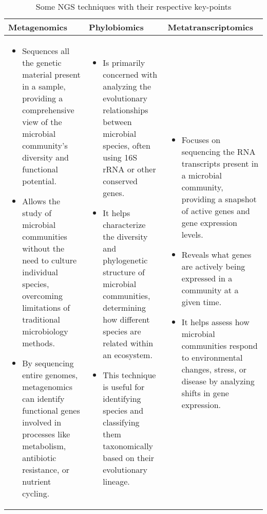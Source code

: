 \begin{table}[htbp]
    \centering
    \caption{Some NGS techniques with their respective key-points}
    \label{tab:NGS_techniques}
    \begin{tabularx}{\textwidth}{p{}|p{}|p{}}
        \textbf{Metagenomics} & \textbf{Phylobiomics} & \textbf{Metatranscriptomics} \\
        \hline
        \begin{itemize}[left=0pt]
            \item Sequences all the genetic material present in a sample, providing a comprehensive view of the microbial community's diversity and functional potential.
            \item Allows the study of microbial communities without the need to culture individual species, overcoming limitations of traditional microbiology methods.
            \item By sequencing entire genomes, metagenomics can identify functional genes involved in processes like metabolism, antibiotic resistance, or nutrient cycling.
        \end{itemize} &
        \begin{itemize}[left=0pt]
            \item Is primarily concerned with analyzing the evolutionary relationships between microbial species, often using 16S rRNA or other conserved genes.
            \item It helps characterize the diversity and phylogenetic structure of microbial communities, determining how different species are related within an ecosystem.
            \item This technique is useful for identifying species and classifying them taxonomically based on their evolutionary lineage.
        \end{itemize} &
        \begin{itemize}[left=0pt]
            \item Focuses on sequencing the RNA transcripts present in a microbial community, providing a snapshot of active genes and gene expression levels.
            \item Reveals what genes are actively being expressed in a community at a given time.
            \item It helps assess how microbial communities respond to environmental changes, stress, or disease by analyzing shifts in gene expression.
        \end{itemize} \\
    \end{tabularx}
\end{table}

